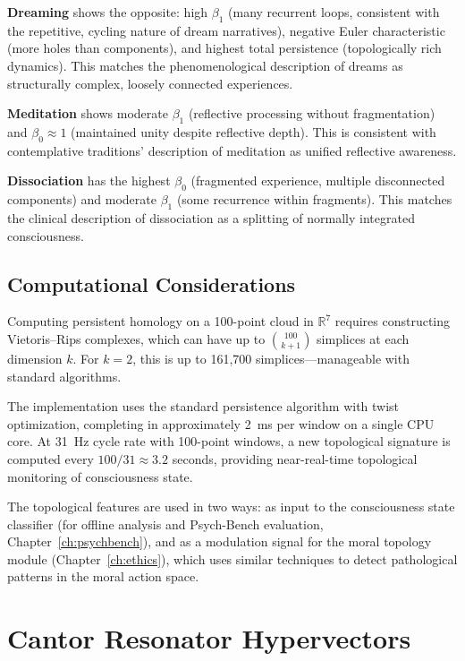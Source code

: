\documentclass[12pt]{book}
\newcommand{\R}{\mathbb{R}}
\begin{document}
\textbf{Dreaming} shows the opposite: high $\beta_1$ (many recurrent loops, consistent with the repetitive, cycling nature of dream narratives), negative Euler characteristic (more holes than components), and highest total persistence (topologically rich dynamics). This matches the phenomenological description of dreams as structurally complex, loosely connected experiences.

\textbf{Meditation} shows moderate $\beta_1$ (reflective processing without fragmentation) and $\beta_0 \approx 1$ (maintained unity despite reflective depth). This is consistent with contemplative traditions' description of meditation as unified reflective awareness.

\textbf{Dissociation} has the highest $\beta_0$ (fragmented experience, multiple disconnected components) and moderate $\beta_1$ (some recurrence within fragments). This matches the clinical description of dissociation as a splitting of normally integrated consciousness.

\section{Computational Considerations}

Computing persistent homology on a 100-point cloud in $\R^7$ requires constructing Vietoris--Rips complexes, which can have up to $\binom{100}{k+1}$ simplices at each dimension $k$. For $k = 2$, this is up to 161,700 simplices---manageable with standard algorithms.

The implementation uses the standard persistence algorithm with twist optimization, completing in approximately 2~ms per window on a single CPU core. At 31~Hz cycle rate with 100-point windows, a new topological signature is computed every $100/31 \approx 3.2$ seconds, providing near-real-time topological monitoring of consciousness state.

The topological features are used in two ways: as input to the consciousness state classifier (for offline analysis and Psych-Bench evaluation, Chapter~\ref{ch:psychbench}), and as a modulation signal for the moral topology module (Chapter~\ref{ch:ethics}), which uses similar techniques to detect pathological patterns in the moral action space.


\chapter{Cantor Resonator Hypervectors}
\label{ch:cantor}
\end{document}
